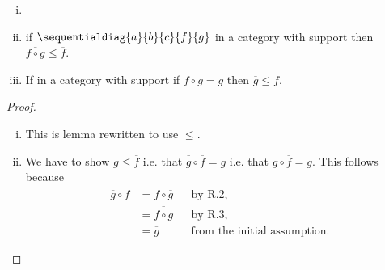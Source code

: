 

\begin{oldtt}
\begin{lemma}
\begin{enumerate}[(i)]
\item \item
if $\sequentialdiag{a}{b}{c}{f}{g}$ in a category with support
then $\overline{f \circ g} \leq \overline{f}$.
\item If \fgsourcediag in a category with support
if $\overline{f} \circ g = g$ 
then $\overline{g} \leq \overline{f}$.
\end{enumerate}
\end{lemma}
\begin{proof}
\begin{enumerate}[(i)]
\item This is lemma  rewritten to use $\leq$.
\item We have to show $\overline{g} \leq \overline{f}$ i.e. that $\overline{\overline{g}} \circ \overline{f} = \overline{g}$
i.e. that $\overline{g} \circ \overline{f} = \overline{g}$. This follows because
\begin{align*}
\overline{g} \circ \overline{f} &= \overline{f} \circ \overline{g} &&\mbox{by R.2,} \\
                      &= \overline{\overline{f} \circ g} && \mbox{by R.3,} \\
                      &= \overline{g} &&\mbox{from the initial assumption.}
\end{align*}
\end{enumerate}
\end{proof}
\end{oldtt}






